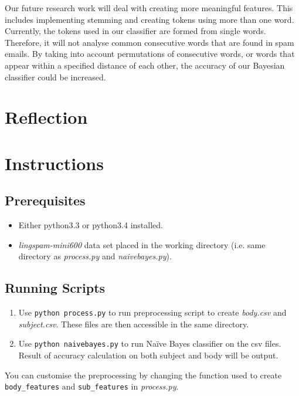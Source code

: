 \documentclass[10pt, a4paper]{article}
\begin{document}
Our future research work will deal with creating more meaningful features. This includes implementing stemming and creating tokens using more than one word. Currently, the tokens used in our classifier are formed from single words. Therefore, it will not analyse common consecutive words that are found in spam emails. By taking into account permutations of consecutive words, or words that appear within a specified distance of each other, the accuracy of our Bayesian classifier could be increased.

\section{Reflection}

\section{Instructions}

\subsection{Prerequisites}

\begin{itemize}
\item Either python3.3 or python3.4 installed.
\item \textit{lingspam-mini600} data set placed in the working directory (i.e. same directory as \textit{process.py} and \textit{naivebayes.py}).
\end{itemize}

\subsection{Running Scripts}

\begin{enumerate}
\item Use \verb|python process.py| to run preprocessing script to create \textit{body.csv} and \textit{subject.csv}. These files are then accessible in the same directory. 
\item Use \verb|python naivebayes.py| to run Na\"ive Bayes classifier on the csv files. Result of accuracy calculation on both subject and body will be output.
\end{enumerate}

You can customise the preprocessing by changing the function used to create \verb|body_features| and \verb|sub_features| in \textit{process.py}.
\end{document}
